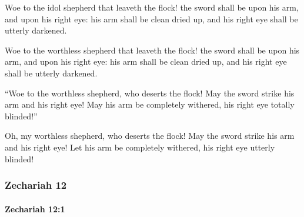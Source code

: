 			Woe to the idol shepherd that leaveth the flock! the sword shall be upon his arm, and upon his right eye: his arm shall be clean dried up, and his right eye shall be utterly darkened.

			\begin{versebox}
					\item[BHS] 
					\item[LXX] 
					\item[ASV] Woe to the worthless shepherd that leaveth the flock! the sword shall be upon his arm, and upon his right eye: his arm shall be clean dried up, and his right eye shall be utterly darkened.
					\item[NIV] “Woe to the worthless shepherd, who deserts the flock! May the sword strike his arm and his right eye! May his arm be completely withered, his right eye totally blinded!”
					\item[NRSV] Oh, my worthless shepherd, who deserts the flock! May the sword strike his arm and his right eye! Let his arm be completely withered, his right eye utterly blinded!
			\end{versebox}
	\subsubsection{Zechariah 12} %
		\label{ZECHARIAH-12}

		\paragraph{Zechariah 12:1} %
			\label{ZECHARIAH-12-1}

